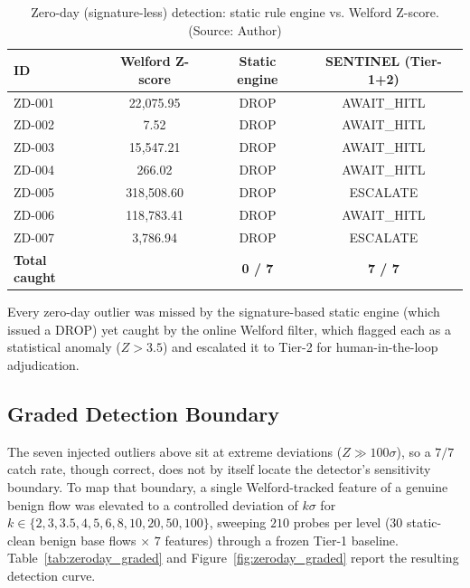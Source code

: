 \begin{table}[!htbp]
    \centering
    \caption{Zero-day (signature-less) detection: static rule engine vs. Welford Z-score. (Source: Author)}
    \label{tab:zeroday}
    \begin{tabular}{|l|c|c|c|}
        \hline
        \textbf{ID} & \textbf{Welford Z-score} & \textbf{Static engine} & \textbf{SENTINEL (Tier-1+2)} \\
        \hline
        ZD-001 & 22{,}075.95 & DROP & AWAIT\_HITL \\
        \hline
        ZD-002 & 7.52 & DROP & AWAIT\_HITL \\
        \hline
        ZD-003 & 15{,}547.21 & DROP & AWAIT\_HITL \\
        \hline
        ZD-004 & 266.02 & DROP & AWAIT\_HITL \\
        \hline
        ZD-005 & 318{,}508.60 & DROP & ESCALATE \\
        \hline
        ZD-006 & 118{,}783.41 & DROP & AWAIT\_HITL \\
        \hline
        ZD-007 & 3{,}786.94 & DROP & ESCALATE \\
        \hline
        \textbf{Total caught} & & \textbf{0 / 7} & \textbf{7 / 7} \\
        \hline
    \end{tabular}
\end{table}

Every zero-day outlier was missed by the signature-based static engine (which issued a DROP) yet caught by the online Welford filter, which flagged each as a statistical anomaly ($Z > 3.5$) and escalated it to Tier-2 for human-in-the-loop adjudication.

\subsection{Graded Detection Boundary}
The seven injected outliers above sit at extreme deviations ($Z \gg 100\sigma$), so a $7/7$ catch rate, though correct, does not by itself locate the detector's sensitivity boundary. To map that boundary, a single Welford-tracked feature of a genuine benign flow was elevated to a controlled deviation of $k\sigma$ for $k \in \{2, 3, 3.5, 4, 5, 6, 8, 10, 20, 50, 100\}$, sweeping $210$ probes per level ($30$ static-clean benign base flows $\times$ $7$ features) through a frozen Tier-1 baseline. Table~\ref{tab:zeroday_graded} and Figure~\ref{fig:zeroday_graded} report the resulting detection curve.

